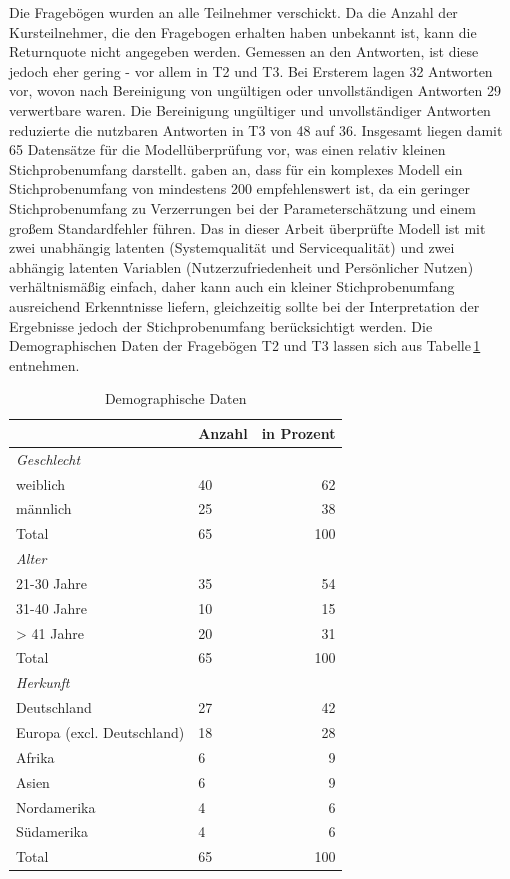 Die Fragebögen wurden an alle Teilnehmer verschickt. Da die Anzahl der Kursteilnehmer, die den Fragebogen erhalten haben unbekannt ist, kann die Returnquote nicht angegeben werden. Gemessen an den Antworten, ist diese jedoch eher gering - vor allem in T2 und T3. Bei Ersterem lagen 32 Antworten vor, wovon nach Bereinigung von ungültigen oder unvollständigen Antworten 29 verwertbare waren. Die Bereinigung ungültiger und unvollständiger Antworten reduzierte die nutzbaren Antworten in T3 von 48 auf 36. Insgesamt liegen damit 65 Datensätze für die Modellüberprüfung vor, was einen relativ kleinen Stichprobenumfang darstellt. \cite[S. 5]{jakobowicz2006understanding} gaben an, dass für ein komplexes Modell ein Stichprobenumfang von mindestens 200 empfehlenswert ist, da ein geringer Stichprobenumfang zu Verzerrungen bei der Parameterschätzung und einem großem Standardfehler führen. Das in dieser Arbeit überprüfte Modell ist mit zwei unabhängig latenten (Systemqualität und Servicequalität) und zwei abhängig latenten Variablen (Nutzerzufriedenheit und Persönlicher Nutzen) verhältnismäßig einfach, daher kann auch ein kleiner Stichprobenumfang ausreichend Erkenntnisse liefern, gleichzeitig sollte bei der Interpretation der Ergebnisse jedoch der Stichprobenumfang berücksichtigt werden. 
Die Demographischen Daten der Fragebögen T2 und T3 lassen sich aus Tabelle\,\ref{tab:Demographische Daten} entnehmen. 
 

\begin{table}[ht] 
\footnotesize
\caption{Demographische Daten}
\label{tab:Demographische Daten} 
\begin{tabular}{@{}lp{5cm}r@{}} \toprule

 & \textbf{Anzahl}&\textbf{in Prozent} \\ \midrule

\textit{Geschlecht}		& 				& \\ 
weiblich 				&  40 			& 62 \\
männlich				&  25			& 38 \\ 
Total					&  65			& 100 \\
\textit{Alter}			& 				&   \\
21-30 Jahre				&  35			& 54 \\
31-40 Jahre				&  10			& 15	  \\
> 41 Jahre				&  20 			& 31 \\
Total 					&  65			& 100 \\
\textit{Herkunft}		&				&   \\
Deutschland				& 27 			& 42  \\
Europa (excl. Deutschland) &18			& 28  \\
Afrika 					& 6				& 9   \\
Asien 					& 6				& 9   \\
Nordamerika				& 4				& 6   \\
Südamerika				& 4				& 6	 \\
Total					& 65				& 100  \\ 
  \bottomrule

\end{tabular}	
\end{table}


